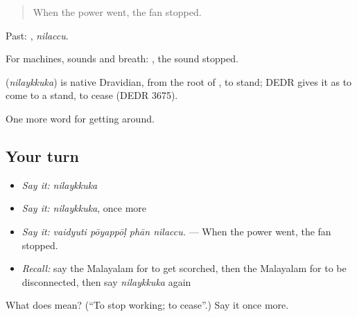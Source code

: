\begin{quote}
When the power went, the fan stopped.
\end{quote}

Past: , \emph{nilaccu}.

For machines, sounds and breath:  , the sound stopped.

\begin{cousinweb}
\textbf{} (\emph{nilaykkuka}) is native Dravidian, from the root of , to stand; DEDR gives it as to come to a stand, to cease (DEDR 3675).
\end{cousinweb}

\begin{grammarlens}[title={What you've built}]
One more word for getting around.
\end{grammarlens}

\subsection*{Your turn}
\begin{itemize}
\raggedright
  \item \emph{Say it:} \emph{nilaykkuka}
  \item \emph{Say it:} \emph{nilaykkuka}, once more
  \item \emph{Say it:} \emph{vaidyuti pōyappōḷ phān nilaccu.} — When the power went, the fan stopped.
  \item \emph{Recall:} say the Malayalam for to get scorched, then the Malayalam for to be disconnected, then say \emph{nilaykkuka} again
\end{itemize}

\begin{tcolorbox}[breakable,colback=teal!4,colframe=teal!35!black,title={Before you move on}]
What does  mean? (\textquotedblleft{}To stop working; to cease\textquotedblright{}.) Say it once more.
\end{tcolorbox}

